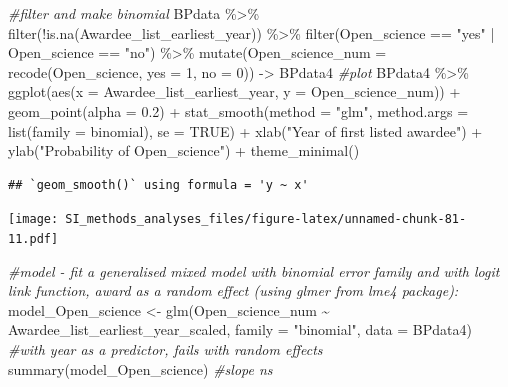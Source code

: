 \documentclass[
]{article}
\newenvironment{Shaded}{\begin{snugshade}}{\end{snugshade}}
\newcommand{\AttributeTok}[1]{\textcolor[rgb]{0.77,0.63,0.00}{#1}}
\newcommand{\CommentTok}[1]{\textcolor[rgb]{0.56,0.35,0.01}{\textit{#1}}}
\newcommand{\ConstantTok}[1]{\textcolor[rgb]{0.00,0.00,0.00}{#1}}
\newcommand{\DecValTok}[1]{\textcolor[rgb]{0.00,0.00,0.81}{#1}}
\newcommand{\FloatTok}[1]{\textcolor[rgb]{0.00,0.00,0.81}{#1}}
\newcommand{\FunctionTok}[1]{\textcolor[rgb]{0.00,0.00,0.00}{#1}}
\newcommand{\NormalTok}[1]{#1}
\newcommand{\OtherTok}[1]{\textcolor[rgb]{0.56,0.35,0.01}{#1}}
\newcommand{\SpecialCharTok}[1]{\textcolor[rgb]{0.00,0.00,0.00}{#1}}
\newcommand{\StringTok}[1]{\textcolor[rgb]{0.31,0.60,0.02}{#1}}
\begin{document}
\begin{Shaded}
\begin{Highlighting}[]
\CommentTok{\#filter and make binomial }
\NormalTok{BPdata }\SpecialCharTok{\%\textgreater{}\%} 
  \FunctionTok{filter}\NormalTok{(}\SpecialCharTok{!}\FunctionTok{is.na}\NormalTok{(Awardee\_list\_earliest\_year)) }\SpecialCharTok{\%\textgreater{}\%} 
  \FunctionTok{filter}\NormalTok{(Open\_science }\SpecialCharTok{==} \StringTok{"yes"} \SpecialCharTok{|}\NormalTok{ Open\_science }\SpecialCharTok{==} \StringTok{"no"}\NormalTok{) }\SpecialCharTok{\%\textgreater{}\%}  
  \FunctionTok{mutate}\NormalTok{(}\AttributeTok{Open\_science\_num =} \FunctionTok{recode}\NormalTok{(Open\_science, }\AttributeTok{yes =} \DecValTok{1}\NormalTok{, }\AttributeTok{no =} \DecValTok{0}\NormalTok{))  }\OtherTok{{-}\textgreater{}}\NormalTok{ BPdata4}
\CommentTok{\#plot}
\NormalTok{BPdata4 }\SpecialCharTok{\%\textgreater{}\%}
  \FunctionTok{ggplot}\NormalTok{(}\FunctionTok{aes}\NormalTok{(}\AttributeTok{x =}\NormalTok{ Awardee\_list\_earliest\_year, }\AttributeTok{y =}\NormalTok{ Open\_science\_num)) }\SpecialCharTok{+} 
  \FunctionTok{geom\_point}\NormalTok{(}\AttributeTok{alpha =} \FloatTok{0.2}\NormalTok{) }\SpecialCharTok{+} 
  \FunctionTok{stat\_smooth}\NormalTok{(}\AttributeTok{method =} \StringTok{"glm"}\NormalTok{, }\AttributeTok{method.args =} \FunctionTok{list}\NormalTok{(}\AttributeTok{family =}\NormalTok{ binomial), }\AttributeTok{se =} \ConstantTok{TRUE}\NormalTok{) }\SpecialCharTok{+}
  \FunctionTok{xlab}\NormalTok{(}\StringTok{"Year of first listed awardee"}\NormalTok{) }\SpecialCharTok{+} 
  \FunctionTok{ylab}\NormalTok{(}\StringTok{"Probability of Open\_science"}\NormalTok{) }\SpecialCharTok{+}
  \FunctionTok{theme\_minimal}\NormalTok{()}
\end{Highlighting}
\end{Shaded}

\begin{verbatim}
## `geom_smooth()` using formula = 'y ~ x'
\end{verbatim}

\texttt{[image: SI\_methods\_analyses\_files/figure-latex/unnamed-chunk-81-11.pdf]}

\begin{Shaded}
\begin{Highlighting}[]
\CommentTok{\#model {-} fit a generalised mixed model with binomial error family and with logit link function, award as a random effect (using glmer from lme4 package):}
\NormalTok{model\_Open\_science }\OtherTok{\textless{}{-}} \FunctionTok{glm}\NormalTok{(Open\_science\_num }\SpecialCharTok{\textasciitilde{}}\NormalTok{ Awardee\_list\_earliest\_year\_scaled, }\AttributeTok{family =} \StringTok{"binomial"}\NormalTok{, }\AttributeTok{data =}\NormalTok{ BPdata4) }\CommentTok{\#with year as a predictor, fails with random effects}
\FunctionTok{summary}\NormalTok{(model\_Open\_science) }\CommentTok{\#slope ns}
\end{Highlighting}
\end{Shaded}
\end{document}
